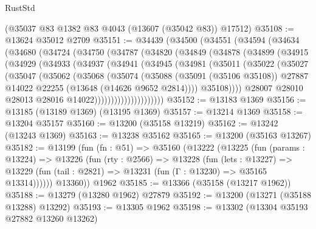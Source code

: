 \begin{lexlean}{RustStd}
\begin{coremodule}
    (@35037 @83 @1382 @83 @4043 (@13607 (@35042 @83)) @17512)
@35108 := @13624 @35012 @2709
@35151 := @34439
    (@34500
      (@34551
        (@34594
          (@34634
            (@34680
              (@34724
                (@34750
                  (@34787
                    (@34820
                      (@34849
                        (@34878
                          (@34899
                            (@34915
                              (@34929
                                (@34933
                                  (@34937
                                    (@34941
                                      (@34945
                                        (@34981
                                          (@35011
                                            (@35022
                                              (@35027
                                                (@35047
                                                  (@35062
                                                    (@35068
                                                      (@35074
                                                        (@35088
                                                          (@35091 (@35106 @35108))
                                                          @27887
                                                          @14022
                                                          @22255
                                                          (@13648 (@14626 @9652 @2814))))
                                                      @35108))))
                                              @28007
                                              @28010
                                              @28013
                                              @28016
                                              @14022)))))))))))))))))))))
@35152 := @13183 @1369
@35156 := @13185 (@13189 @1369) (@13195 @1369)
@35157 := @13214 @1369
@35158 := @13204 @35157
@35160 := @13200 (@35158 @13219)
@35162 := @13242 (@13243 @1369)
@35163 := @13238 @35162
@35165 := @13200 (@35163 @13267)
@35182 := @13199
    (fun (fn : @51) =>
    @35160
      (@13222
        (@13225
          (fun (params : @13224) =>
          @13226
            (fun (rty : @2566) =>
            @13228
              (fun (lets : @13227) =>
              @13229 (fun (tail : @2821) => @13231 (fun (Γ : @13230) => @35165 @13314))))))
        @13360))
    @1962
@35185 := @13366 (@35158 (@13217 @1962))
@35188 := @13279 (@13280 @1962) @27879
@35192 := @13200 (@13271 (@35188 @13288) @13292)
@35193 := @13305 @1962
@35198 := @13302 (@13304 @35193 @27882 @13260 @13262)

\end{coremodule}
\end{lexlean}
